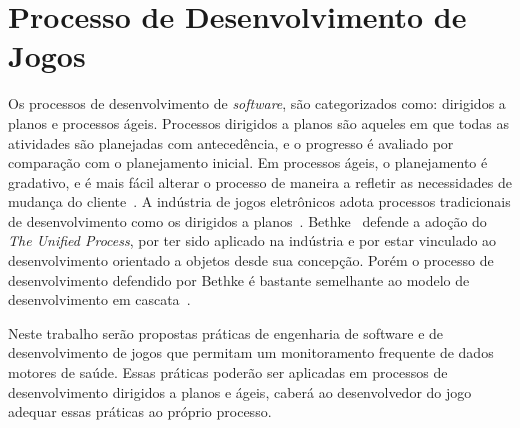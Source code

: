 






\section{Processo de Desenvolvimento de Jogos}
Os processos de desenvolvimento de \textit{software}, são categorizados como: dirigidos a planos e processos ágeis. Processos dirigidos a planos são aqueles em que todas as atividades são planejadas com antecedência, e o progresso é avaliado por comparação com o planejamento inicial. Em processos ágeis, o planejamento é gradativo, e é mais fácil alterar o processo de maneira a refletir as necessidades de mudança do cliente~\cite{sommerville2011}. A indústria de jogos eletrônicos adota processos tradicionais de desenvolvimento como os dirigidos a planos~\cite{flynt2005software,bethke2003game}. Bethke~\cite{bethke2003game} defende a adoção do \textit{The Unified Process}, por ter sido aplicado na indústria e por estar vinculado ao desenvolvimento orientado a objetos desde sua concepção. Porém o processo de desenvolvimento defendido por Bethke é bastante semelhante ao modelo de desenvolvimento em cascata~\cite{sommerville2011}.

Neste trabalho serão propostas práticas de engenharia de software e de desenvolvimento de jogos que permitam um monitoramento frequente de dados motores de saúde. Essas práticas poderão ser aplicadas em processos de desenvolvimento dirigidos a planos e ágeis, caberá ao desenvolvedor do jogo adequar essas práticas ao próprio processo.	

